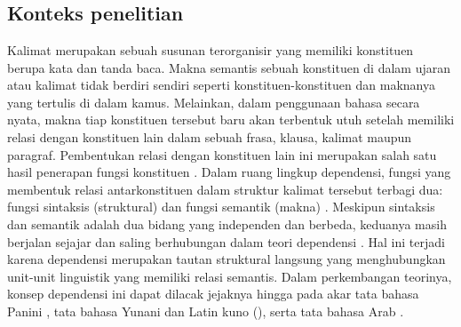 \chapter{\babDua}

\section{Konteks penelitian}
Kalimat merupakan sebuah susunan terorganisir yang memiliki konstituen berupa kata dan tanda baca. Makna semantis sebuah konstituen di dalam ujaran atau kalimat tidak berdiri sendiri seperti konstituen-konstituen dan maknanya yang tertulis di dalam kamus. Melainkan, dalam penggunaan bahasa secara nyata, makna tiap konstituen tersebut baru akan terbentuk utuh setelah memiliki relasi dengan konstituen lain dalam sebuah frasa, klausa, kalimat maupun paragraf. Pembentukan relasi dengan konstituen lain ini merupakan salah satu hasil penerapan fungsi konstituen \citep{tesniere1959elements}. Dalam ruang lingkup dependensi, fungsi yang membentuk relasi antarkonstituen dalam struktur kalimat tersebut terbagi dua: fungsi sintaksis (struktural) dan fungsi semantik (makna) \citep{tesniere1959elements}. Meskipun sintaksis dan semantik adalah dua bidang yang independen dan berbeda, keduanya masih berjalan sejajar dan saling berhubungan dalam teori dependensi \citep{tesniere1959elements}. Hal ini terjadi karena dependensi merupakan tautan struktural langsung yang menghubungkan unit-unit linguistik yang memiliki relasi semantis. Dalam perkembangan teorinya, konsep dependensi ini dapat dilacak jejaknya hingga pada akar tata bahasa Panini \citep{bharati1995natural}, tata bahasa Yunani dan Latin kuno (\citealp{covington1984syntactic, percival1990reflections}), serta tata bahasa Arab \citep{owens1988foundations}. 

